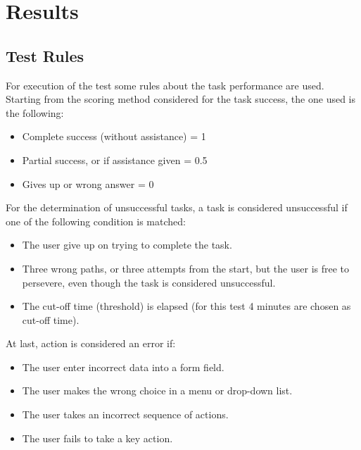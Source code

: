 %
%
\chapter{Results}

\section{Test Rules}
For execution of the test some rules about the task performance are used.
Starting from the scoring method considered for the task success, the one used is the following:
\begin{itemize}
\item Complete success (without assistance) = 1
\item Partial success, or if assistance given = 0.5
\item Gives up or wrong answer = 0
\end{itemize}
For the determination of unsuccessful tasks, a task is considered unsuccessful if one of the following condition is matched:
\begin{itemize}
\item The user give up on trying to complete the task.
\item Three wrong paths, or three attempts from the start, but the user is free to persevere, even though the task is considered unsuccessful.
\item The cut-off time (threshold) is elapsed (for this test 4 minutes are chosen as cut-off time).
\end{itemize}
At last, action is considered an error if:
\begin{itemize}
\item The user enter incorrect data into a form field.
\item The user makes the wrong choice in a menu or drop-down list.
\item The user takes an incorrect sequence of actions.
\item The user fails to take a key action.
\end{itemize}
%
%
